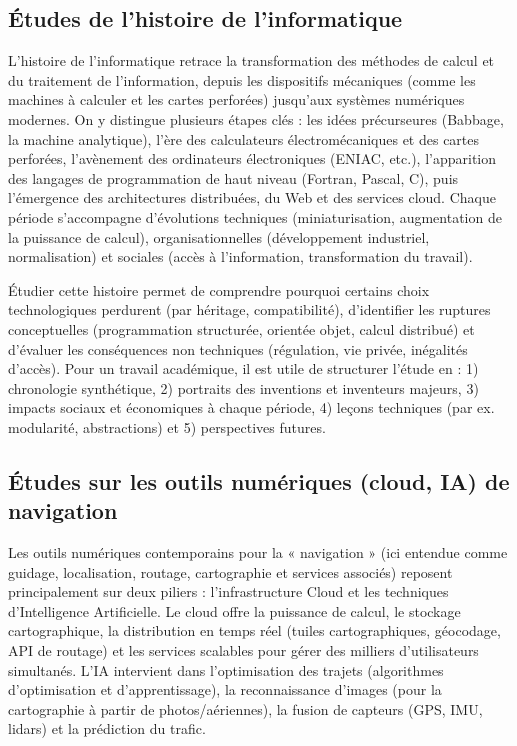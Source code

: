 \subsection{Études de l’histoire de l’informatique}
L’histoire de l’informatique retrace la transformation des méthodes de calcul et du traitement de l’information, depuis les dispositifs mécaniques (comme les machines à calculer et les cartes perforées) jusqu’aux systèmes numériques modernes. On y distingue plusieurs étapes clés : les idées précurseures (Babbage, la machine analytique), l’ère des calculateurs électromécaniques et des cartes perforées, l’avènement des ordinateurs électroniques (ENIAC, etc.), l’apparition des langages de programmation de haut niveau (Fortran, Pascal, C), puis l’émergence des architectures distribuées, du Web et des services cloud. Chaque période s’accompagne d’évolutions techniques (miniaturisation, augmentation de la puissance de calcul), organisationnelles (développement industriel, normalisation) et sociales (accès à l’information, transformation du travail).

Étudier cette histoire permet de comprendre pourquoi certains choix technologiques perdurent (par héritage, compatibilité), d’identifier les ruptures conceptuelles (programmation structurée, orientée objet, calcul distribué) et d’évaluer les conséquences non techniques (régulation, vie privée, inégalités d’accès). Pour un travail académique, il est utile de structurer l’étude en : 1) chronologie synthétique, 2) portraits des inventions et inventeurs majeurs, 3) impacts sociaux et économiques à chaque période, 4) leçons techniques (par ex. modularité, abstractions) et 5) perspectives futures.

\subsection{Études sur les outils numériques (cloud, IA) de navigation}
Les outils numériques contemporains pour la « navigation » (ici entendue comme guidage, localisation, routage, cartographie et services associés) reposent principalement sur deux piliers : l’infrastructure Cloud et les techniques d’Intelligence Artificielle. Le cloud offre la puissance de calcul, le stockage cartographique, la distribution en temps réel (tuiles cartographiques, géocodage, API de routage) et les services scalables pour gérer des milliers d’utilisateurs simultanés. L’IA intervient dans l’optimisation des trajets (algorithmes d’optimisation et d’apprentissage), la reconnaissance d’images (pour la cartographie à partir de photos/aériennes), la fusion de capteurs (GPS, IMU, lidars) et la prédiction du trafic.

